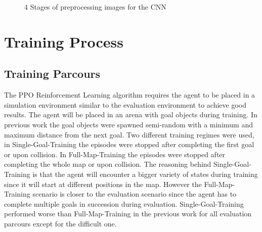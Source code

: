 \begin{figure}
     \centering
     \qquad
     \qquad
     \caption{4 Stages of preprocessing images for the CNN}
     \label{fig:4bildchen}
\end{figure}


\section{Training Process}


\subsection*{Training Parcours}
The PPO Reinforcement Learning algorithm requires the agent to be placed in a simulation environment similar to the evaluation environment to achieve good results. The agent will be placed in an arena with goal objects during training. In previous work \autocite{maximilian} the goal objects were spawned semi-random with a minimum and maximum distance from the next goal. Two different training regimes were used, in Single-Goal-Training the episodes were stopped after completing the first goal or upon collision. In Full-Map-Training the episodes were stopped after completing the whole map or upon collision. The reasoning behind Single-Goal-Training is that the agent will encounter a bigger variety of states during training since it will start at different positions in the map. However the Full-Map-Training scenario is closer to the evaluation scenario since the agent has to complete multiple goals in succession during evaluation.
Single-Goal-Training performed worse than Full-Map-Training in the previous work \autocite{maximilian} for all evaluation parcours except for the difficult one.

